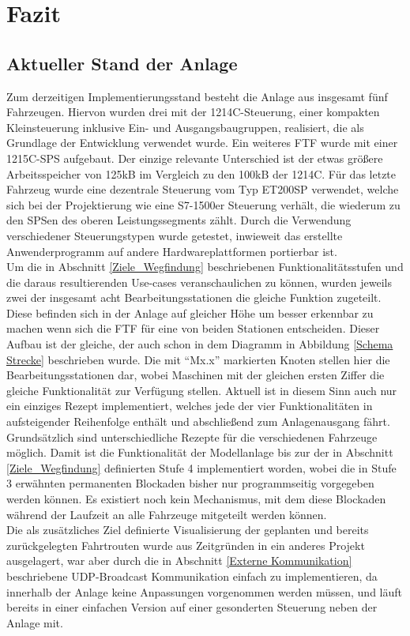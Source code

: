 \chapter{Fazit}

\section{Aktueller Stand der Anlage}
	\label{Stand}
	Zum derzeitigen Implementierungsstand besteht die Anlage aus insgesamt fünf Fahrzeugen. Hiervon wurden drei mit der 1214C-Steuerung, einer kompakten Kleinsteuerung inklusive Ein- und Ausgangsbaugruppen, realisiert, die als Grundlage der Entwicklung verwendet wurde. Ein weiteres \ac{FTF} wurde mit einer 1215C-\ac{SPS} aufgebaut. Der einzige relevante Unterschied ist der etwas größere Arbeitsspeicher von 125kB im Vergleich zu den 100kB der 1214C. Für das letzte Fahrzeug wurde eine dezentrale Steuerung vom Typ ET200SP verwendet, welche sich bei der Projektierung wie eine S7-1500er Steuerung verhält, die wiederum zu den \ac{SPS}en des oberen Leistungssegments zählt. Durch die Verwendung verschiedener Steuerungstypen wurde getestet, inwieweit das erstellte Anwenderprogramm auf andere Hardwareplattformen portierbar ist. 
	\\[4pt]
	Um die in Abschnitt \ref{Ziele_Wegfindung} beschriebenen Funktionalitätsstufen und die daraus resultierenden Use-cases veranschaulichen zu können, wurden jeweils zwei der insgesamt acht Bearbeitungsstationen die gleiche Funktion zugeteilt. Diese befinden sich in der Anlage auf gleicher Höhe um besser erkennbar zu machen wenn sich die \ac{FTF} für eine von beiden Stationen entscheiden. Dieser Aufbau ist der gleiche, der auch schon in dem Diagramm in Abbildung \ref{Schema Strecke} beschrieben wurde. Die mit "`Mx.x"' markierten Knoten stellen hier die Bearbeitungsstationen dar, wobei Maschinen mit der gleichen ersten Ziffer die gleiche Funktionalität zur Verfügung stellen. Aktuell ist in diesem Sinn auch nur ein einziges Rezept implementiert, welches jede der vier Funktionalitäten in aufsteigender Reihenfolge enthält und abschließend zum Anlagenausgang fährt. Grundsätzlich sind unterschiedliche Rezepte für die verschiedenen Fahrzeuge möglich. Damit ist die Funktionalität der Modellanlage bis zur der in Abschnitt \ref{Ziele_Wegfindung} definierten Stufe 4 implementiert worden, wobei die in Stufe 3 erwähnten permanenten Blockaden bisher nur programmseitig vorgegeben werden können. Es existiert noch kein Mechanismus, mit dem diese Blockaden während der Laufzeit an alle Fahrzeuge mitgeteilt werden können.
	\\[4pt]
	Die als zusätzliches Ziel definierte Visualisierung der geplanten und bereits zurückgelegten Fahrtrouten wurde aus Zeitgründen in ein anderes Projekt ausgelagert, war aber durch die in Abschnitt \ref{Externe Kommunikation} beschriebene \ac{UDP}-Broadcast Kommunikation einfach zu implementieren, da innerhalb der Anlage keine Anpassungen vorgenommen werden müssen, und läuft bereits in einer einfachen Version auf einer gesonderten Steuerung neben der Anlage mit.
	
